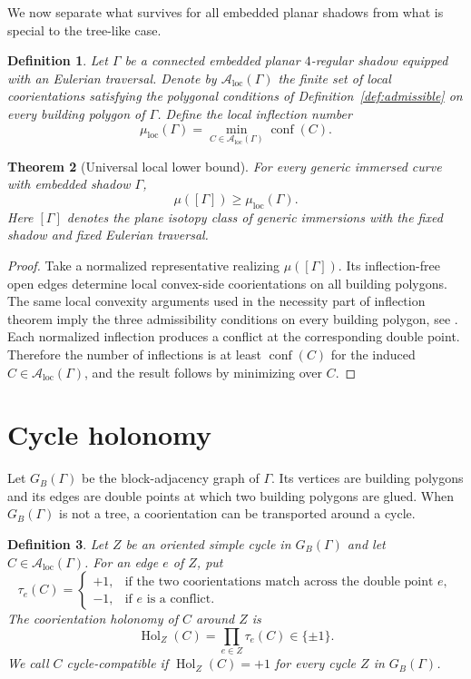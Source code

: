 \documentclass[11pt]{article}
\newtheorem{theorem}{Theorem}[section]
\newtheorem{definition}[theorem]{Definition}
\newcommand{\A}{\mathcal A}
\newcommand{\conf}{\operatorname{conf}}
\newcommand{\Hol}{\operatorname{Hol}}
\newcommand{\loc}{\mathrm{loc}}
\begin{document}
We now separate what survives for all embedded planar shadows from what is special to the tree-like case.

\begin{definition}
Let $\Gamma$ be a connected embedded planar $4$-regular shadow equipped with an Eulerian traversal.  Denote by $\A_{\loc}(\Gamma)$ the finite set of local coorientations satisfying the polygonal conditions of Definition~\ref{def:admissible} on every building polygon of $\Gamma$.  Define the \emph{local inflection number}
\[
 \mu_{\loc}(\Gamma)=\min_{C\in\A_{\loc}(\Gamma)}\conf(C).
\]
\end{definition}

\begin{theorem}[Universal local lower bound]\label{thm:locallower}
For every generic immersed curve with embedded shadow $\Gamma$,
\[
 \mu([\Gamma])\ge \mu_{\loc}(\Gamma).
\]
Here $[\Gamma]$ denotes the plane isotopy class of generic immersions with the fixed shadow and fixed Eulerian traversal.
\end{theorem}

\begin{proof}
Take a normalized representative realizing $\mu([\Gamma])$.  Its inflection-free open edges determine local convex-side coorientations on all building polygons.  The same local convexity arguments used in the necessity part of inflection theorem imply the three admissibility conditions on every building polygon, see \cite{ShapiroTree}.  Each normalized inflection produces a conflict at the corresponding double point.  Therefore the number of inflections is at least $\conf(C)$ for the induced $C\in\A_{\loc}(\Gamma)$, and the result follows by minimizing over $C$.
\end{proof}


\section{Cycle holonomy}

Let $G_B(\Gamma)$ be the block-adjacency graph of $\Gamma$.  Its vertices are building polygons and its edges are double points at which two building polygons are glued.  When $G_B(\Gamma)$ is not a tree, a coorientation can be transported around a cycle.

\begin{definition}\label{def:holonomy}
Let $Z$ be an oriented simple cycle in $G_B(\Gamma)$ and let $C\in\A_{\loc}(\Gamma)$.  For an edge $e$ of $Z$, put
\[
 \tau_e(C)=
 \begin{cases}
 +1,&\text{if the two coorientations match across the double point }e,\\
 -1,&\text{if }e\text{ is a conflict.}
 \end{cases}
\]
The \emph{coorientation holonomy} of $C$ around $Z$ is
\[
 \Hol_Z(C)=\prod_{e\in Z}\tau_e(C)\in\{\pm1\}.
\]
We call $C$ \emph{cycle-compatible} if $\Hol_Z(C)=+1$ for every cycle $Z$ in $G_B(\Gamma)$.
\end{definition}
\end{document}
